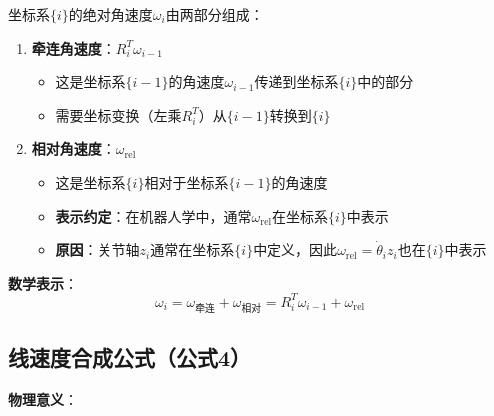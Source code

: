 \documentclass[12pt,a4paper]{article}
\begin{document}
坐标系$\{i\}$的绝对角速度$\omega_i$由两部分组成：
\begin{enumerate}
\item \textbf{牵连角速度}：$R_i^T \omega_{i-1}$
\begin{itemize}
\item 这是坐标系$\{i-1\}$的角速度$\omega_{i-1}$传递到坐标系$\{i\}$中的部分
\item 需要坐标变换（左乘$R_i^T$）从$\{i-1\}$转换到$\{i\}$
\end{itemize}

\item \textbf{相对角速度}：$\omega_{\text{rel}}$
\begin{itemize}
\item 这是坐标系$\{i\}$相对于坐标系$\{i-1\}$的角速度
\item \textbf{表示约定}：在机器人学中，通常$\omega_{\text{rel}}$在坐标系$\{i\}$中表示
\item \textbf{原因}：关节轴$z_i$通常在坐标系$\{i\}$中定义，因此$\omega_{\text{rel}} = \dot{\theta}_i z_i$也在$\{i\}$中表示
\end{itemize}
\end{enumerate}

\textbf{数学表示}：
\begin{equation}
\omega_i = \omega_{\text{牵连}} + \omega_{\text{相对}} = R_i^T \omega_{i-1} + \omega_{\text{rel}}
\end{equation}

\subsection{线速度合成公式（公式4）}

\textbf{物理意义}：
\end{document}

